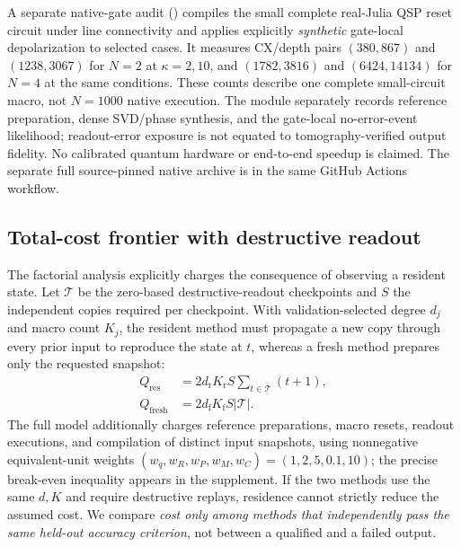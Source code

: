 \documentclass{ieeeaccess}
\begin{document}
A separate native-gate audit
() compiles the
small complete real-Julia QSP reset circuit under line
connectivity and applies explicitly \emph{synthetic}
gate-local depolarization to selected cases.
It measures CX/depth pairs $(380,867)$ and $(1238,3067)$
for $N=2$ at $\kappa=2,10$, and $(1782,3816)$ and
$(6424,14134)$ for $N=4$ at the same conditions.
These counts describe one complete small-circuit macro,
not $N=1000$ native execution. The module separately records
reference preparation, dense SVD/phase synthesis, and the
gate-local no-error-event likelihood; readout-error exposure
is not equated to tomography-verified output fidelity.
No calibrated quantum hardware or end-to-end speedup is claimed.
The separate full source-pinned native archive is in the same
GitHub Actions workflow.


\subsection{Total-cost frontier with destructive readout}
\label{sec:costfrontier}
The factorial analysis explicitly charges the consequence of observing a resident state. Let $\mathcal{T}$ be the zero-based destructive-readout checkpoints and $S$ the independent copies required per checkpoint. With validation-selected degree $d_j$ and macro count $K_j$, the resident method must propagate a new copy through every prior input to reproduce the state at $t$, whereas a fresh method prepares only the requested snapshot:
\begin{equation}\label{eq:replayqueries}
\begin{aligned}
Q_{\mathrm{res}}&=2d_{\mathrm r}K_{\mathrm r}S\sum_{t\in\mathcal{T}}(t+1),\\
Q_{\mathrm{fresh}}&=2d_{\mathrm f}K_{\mathrm f}S|\mathcal{T}|.
\end{aligned}
\end{equation}
The full model additionally charges reference preparations, macro resets, readout executions, and compilation of distinct input snapshots, using nonnegative equivalent-unit weights $(w_q,w_R,w_P,w_M,w_C)=(1,2,5,0.1,10)$; the precise break-even inequality appears in the supplement. If the two methods use the same $d,K$ and require destructive replays, residence cannot strictly reduce the assumed cost. We compare \emph{cost only among methods that independently pass the same held-out accuracy criterion}, not between a qualified and a failed output.
\end{document}
